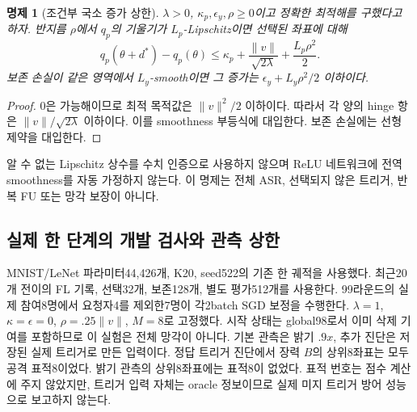 \documentclass[10pt,a4paper]{article}
\newtheorem{proposition}{명제}
\begin{document}
\begin{proposition}[조건부 국소 증가 상한]
$\lambda>0$, $\kappa_p,\epsilon_y,\rho\ge0$이고 정확한 최적해를 구했다고 하자.
반지름 $\rho$에서 $q_p$의 기울기가 $L_p$-Lipschitz이면 선택된 좌표에 대해
\begin{equation}
q_p(\theta+d^*)-q_p(\theta)
\le\kappa_p+\frac{\|v\|}{\sqrt{2\lambda}}+\frac{L_p\rho^2}{2}.
\end{equation}
보존 손실이 같은 영역에서 $L_y$-smooth이면 그 증가는 $\epsilon_y+L_y\rho^2/2$ 이하이다.
\end{proposition}
\begin{proof}
0은 가능해이므로 최적 목적값은 $\|v\|^2/2$ 이하이다.
따라서 각 양의 hinge 항은 $\|v\|/\sqrt{2\lambda}$ 이하이다.
이를 smoothness 부등식에 대입한다. 보존 손실에는 선형 제약을 대입한다.
\end{proof}
알 수 없는 Lipschitz 상수를 수치 인증으로 사용하지 않으며 ReLU 네트워크에 전역 smoothness를
자동 가정하지 않는다. 이 명제는 전체 ASR, 선택되지 않은 트리거, 반복 FU 또는 망각 보장이 아니다.

\subsection{실제 한 단계의 개발 검사와 관측 상한}
MNIST/LeNet 파라미터44,426개, K20, seed522의 기존 한 궤적을 사용했다.
최근20개 전이의 FL 기록, 선택32개, 보존128개, 별도 평가512개를 사용한다.
99라운드의 실제 참여8명에서 요청자4를 제외한7명이 각2batch SGD 보정을 수행한다.
$\lambda=1$, $\kappa=\epsilon=0$, $\rho=.25\|v\|$, $M=8$로 고정했다.
시작 상태는 global98로서 이미 삭제 기여를 포함하므로 이 실험은 전체 망각이 아니다.
기본 관측은 밝기 $.9x$, 추가 진단은 저장된 실제 트리거로 만든 입력이다.
정답 트리거 진단에서 장력 $B$의 상위8좌표는 모두 공격 표적8이었다.
밝기 관측의 상위8좌표에는 표적8이 없었다. 표적 번호는 점수 계산에 주지 않았지만,
트리거 입력 자체는 oracle 정보이므로 실제 미지 트리거 방어 성능으로 보고하지 않는다.
\end{document}
